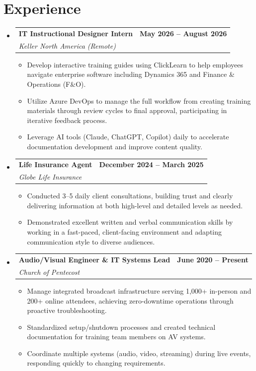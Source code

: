 \documentclass[letterpaper,10.99pt]{article}
\makeatletter
\newcommand{\resumeItem}[1]{
  \item\small{
    {#1 \vspace{-3pt}}
  }
}
\newcommand{\resumeSubheading}[4]{
  \vspace{-2pt}\item
    \begin{tabular*}{1.0\textwidth}[t]{l@{\extracolsep{\fill}}r}
      \textbf{#1} & \textbf{\small #2} \\
      \textit{\small#3} & \textit{\small #4} \\
    \end{tabular*}\vspace{-7pt}
}
\newcommand{\resumeSubHeadingListStart}{\begin{itemize}[leftmargin=0.0in, label={}]}
\newcommand{\resumeSubHeadingListEnd}{\end{itemize}}
\newcommand{\resumeItemListStart}{\begin{itemize}}
\newcommand{\resumeItemListEnd}{\end{itemize}\vspace{-5pt}}
\makeatother
\begin{document}
\section{Experience}
  \resumeSubHeadingListStart
    \resumeSubheading
      {IT Instructional Designer Intern}{May 2026 -- August 2026}
      {Keller North America (Remote)}{}
      \resumeItemListStart
        \resumeItem{Develop interactive training guides using ClickLearn to help employees navigate enterprise software including Dynamics 365 and Finance \& Operations (F\&O).}
        \resumeItem{Utilize Azure DevOps to manage the full workflow from creating training materials through review cycles to final approval, participating in iterative feedback process.}
        \resumeItem{Leverage AI tools (Claude, ChatGPT, Copilot) daily to accelerate documentation development and improve content quality.}
      \resumeItemListEnd
    \resumeSubheading
      {Life Insurance Agent}{December 2024 -- March 2025}
      {Globe Life Insurance}{}
      \resumeItemListStart
        \resumeItem{Conducted 3--5 daily client consultations, building trust and clearly delivering information at both high-level and detailed levels as needed.}
        \resumeItem{Demonstrated excellent written and verbal communication skills by working in a fast-paced, client-facing environment and adapting communication style to diverse audiences.}
      \resumeItemListEnd
    \resumeSubheading
      {Audio/Visual Engineer \& IT Systems Lead}{June 2020 -- Present}
      {Church of Pentecost}{}
      \resumeItemListStart
        \resumeItem{Manage integrated broadcast infrastructure serving 1,000+ in-person and 200+ online attendees, achieving zero-downtime operations through proactive troubleshooting.}
        \resumeItem{Standardized setup/shutdown processes and created technical documentation for training team members on AV systems.}
        \resumeItem{Coordinate multiple systems (audio, video, streaming) during live events, responding quickly to changing requirements.}
      \resumeItemListEnd

  \resumeSubHeadingListEnd
\vspace{-16pt}
\end{document}
